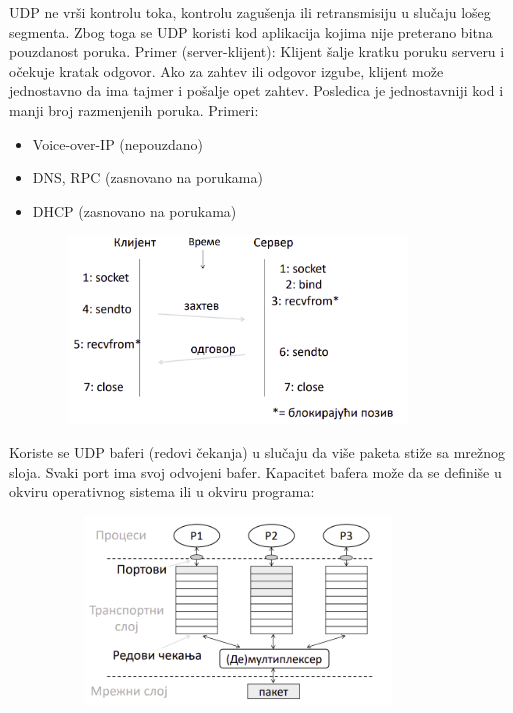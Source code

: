 \documentclass[a4paper]{article}
\begin{document}
    UDP ne vrši kontrolu toka, kontrolu zagušenja ili retransmisiju u slučaju lošeg segmenta.
    Zbog toga se UDP koristi kod aplikacija kojima nije preterano bitna pouzdanost poruka.
    Primer (server-klijent): Klijent šalje kratku poruku serveru i očekuje kratak odgovor. Ako
    za zahtev ili odgovor izgube, klijent može jednostavno da ima tajmer i pošalje opet
    zahtev. Posledica je jednostavniji kod i manji broj razmenjenih poruka. Primeri:
    \begin{itemize}
        \item Voice-over-IP (nepouzdano)
        \item DNS, RPC (zasnovano na porukama)
        \item DHCP (zasnovano na porukama)
    \end{itemize}
    \begin{figure}[H]
        \begin{center}
            \includegraphics[width=100mm,height=50mm]{Slike/udp2.png}
        \end{center}
    \end{figure}
    
    Koriste se UDP baferi (redovi čekanja) u slučaju da više paketa stiže sa mrežnog sloja. Svaki
    port ima svoj odvojeni bafer. Kapacitet bafera može da se definiše u okviru operativnog sistema
    ili u okviru programa:
    \begin{figure}[H]
        \begin{center}
            \includegraphics[width=100mm,height=50mm]{Slike/udp3.png}
        \end{center}
    \end{figure}
\end{document}
